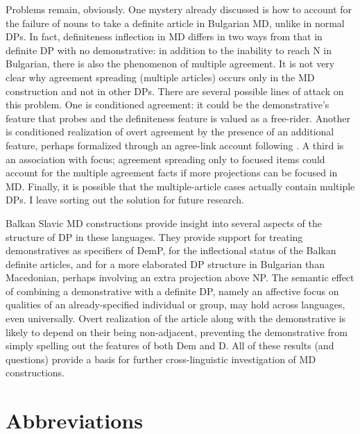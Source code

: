 \documentclass[output=paper,
colorlinks,
citecolor=brown,
newtxmath
]{langscibook}
\begin{document}
Problems remain, obviously. One mystery already discussed is how to account for the failure of nouns to take a definite article in Bulgarian MD, unlike in normal DPs. In fact, definiteness inflection in MD differs in two ways from that in definite DP with no demonstrative: in addition to the inability to reach N in Bulgarian, there is also the phenomenon of multiple agreement. It is not very clear why agreement spreading (multiple articles) occurs only in the MD construction and not in other DPs. There are several possible lines of attack on this problem. One is conditioned agreement: it could be the demonstrative's feature that probes and the definiteness feature is valued as a free-rider. Another is conditioned realization of overt agreement by the presence of an additional feature, perhaps formalized through an agree-link account following \cite{Arregi.Nevins2012,Arregi.Nevins2013}. A third is an association with focus; agreement spreading only to focused items could account for the multiple agreement facts if more projections can be focused in MD. Finally, it is possible that the multiple-article cases actually contain multiple DPs. I leave sorting out the solution for future research.

    \largerpage[-1]

Balkan Slavic MD constructions provide insight into several aspects of the structure of DP in these languages. They provide support for treating demonstratives as specifiers of DemP, for the inflectional status of the Balkan definite articles, and for a more elaborated DP structure in Bulgarian than Macedonian, perhaps involving an extra projection above NP. The semantic effect of combining a demonstrative with a definite DP, namely an affective focus on qualities of an already-specified individual or group, may hold across languages, even universally. Overt realization of the article along with the demonstrative is likely to depend on their being non-adjacent, preventing the demonstrative from simply spelling out the features of both Dem and D. All of these results (and questions) provide a basis for further cross-linguistic investigation of MD constructions.



\section*{Abbreviations}
\end{document}
